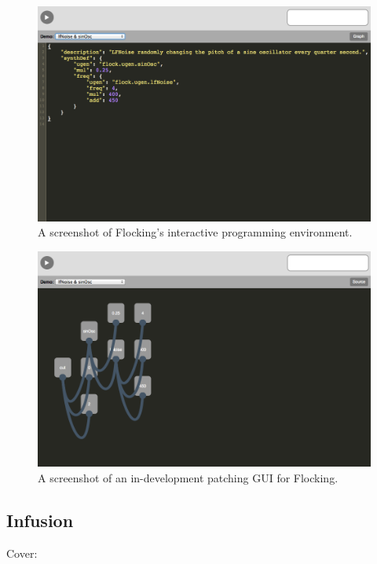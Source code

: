 \documentclass{article}
\begin{document}
\begin{figure}[h]
\centering
\includegraphics[width=0.9\columnwidth]{images/flocking-playground-source-view.png}
\caption{ A screenshot of Flocking's interactive programming environment.\label{fig:playground}}
\end{figure}

\begin{figure}[h]
\centering
\includegraphics[width=0.9\columnwidth]{images/flocking-playground-graphical-view.png}
\caption{ A screenshot of an in-development patching GUI for Flocking.\label{fig:graphical}}
\end{figure}

\subsection{Infusion}

Cover:
\end{document}
